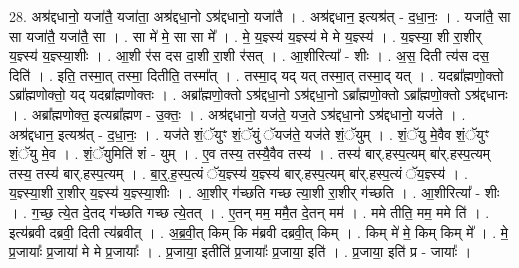 \documentclass[17pt]{extarticle}
\begin{document}
28. अश्र॑द्दधानो॒ यजा॑तै॒ यजा॑ता॒ अश्र॑द्दधा॒नो ऽश्र॑द्दधानो॒ यजा॑तै । . अश्र॑द्दधान॒ इत्यश्र॑त् - द॒धा॒नः॒ । . यजा॑तै॒ सा सा यजा॑तै॒ यजा॑तै॒ सा । . सा मे॑ मे॒ सा सा मे᳚ । . मे॒ य॒ज्ञ्स्य॑ य॒ज्ञ्स्य॑ मे मे य॒ज्ञ्स्य॑ । . य॒ज्ञ्स्या॒ शी रा॒शीर् य॒ज्ञ्स्य॑ य॒ज्ञ्स्या॒शीः । . आ॒शी र॑स दस दा॒शी रा॒शी र॑सत् । . आ॒शीरित्या᳚ - शीः । . अ॒स॒ दिती त्य॑स दस॒ दिति॑ । . इति॒ तस्मा॒त् तस्मा॒ दितीति॒ तस्मा᳚त् । . तस्मा॒द् यद् यत् तस्मा॒त् तस्मा॒द् यत् । . यदब्रा᳚ह्मणो॒क्तो ऽब्रा᳚ह्मणोक्तो॒ यद् यदब्रा᳚ह्मणोक्तः । . अब्रा᳚ह्मणो॒क्तो ऽश्र॑द्दधा॒नो ऽश्र॑द्दधा॒नो ऽब्रा᳚ह्मणो॒क्तो ऽब्रा᳚ह्मणो॒क्तो ऽश्र॑द्दधानः । . अब्रा᳚ह्मणोक्त॒ इत्यब्रा᳚ह्मण - उ॒क्तः॒ । . अश्र॑द्दधानो॒ यज॑ते॒ यज॒ते ऽश्र॑द्दधा॒नो ऽश्र॑द्दधानो॒ यज॑ते । . अश्र॑द्दधान॒ इत्यश्र॑त् - द॒धा॒नः॒ । . यज॑ते शं॒ॅयुꣳ शं॒ॅयुं ॅयज॑ते॒ यज॑ते शं॒ॅयुम् । . शं॒ॅयु मे॒वैव शं॒ॅयुꣳ शं॒ॅयु मे॒व । . शं॒ॅयुमिति॑ शं - युम् । . ए॒व तस्य॒ तस्यै॒वैव तस्य॑ । . तस्य॑ बार्.हस्प॒त्यम् बा॑र्.हस्प॒त्यम् तस्य॒ तस्य॑ बार्.हस्प॒त्यम् । . बा॒र्॒.ह॒स्प॒त्यं ॅय॒ज्ञ्स्य॑ य॒ज्ञ्स्य॑ बार्.हस्प॒त्यम् बा॑र्.हस्प॒त्यं ॅय॒ज्ञ्स्य॑ । . य॒ज्ञ्स्या॒शी रा॒शीर् य॒ज्ञ्स्य॑ य॒ज्ञ्स्या॒शीः । . आ॒शीर् ग॑च्छति गच्छ त्या॒शी रा॒शीर् ग॑च्छति । . आ॒शीरित्या᳚ - शीः । . ग॒च्छ॒ त्ये॒त दे॒तद् ग॑च्छति गच्छ त्ये॒तत् । . ए॒तन् मम॒ ममै॒त दे॒तन् मम॑ । . ममे तीति॒ मम॒ ममे ति॑ । . इत्य॑ब्रवी दब्रवी॒ दिती त्य॑ब्रवीत् । . अ॒ब्र॒वी॒त् किम् कि म॑ब्रवी दब्रवी॒त् किम् । . किम् मे॑ मे॒ किम् किम् मे᳚ । . मे॒ प्र॒जायाः᳚ प्र॒जाया॑ मे मे प्र॒जायाः᳚ । . प्र॒जाया॒ इतीति॑ प्र॒जायाः᳚ प्र॒जाया॒ इति॑ । . प्र॒जाया॒ इति॑ प्र - जायाः᳚ । \newline
\end{document}
